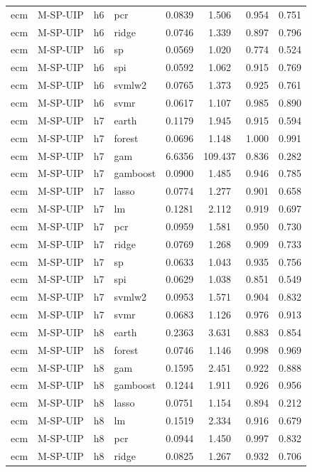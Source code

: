 \begin{ThreePartTable}
\begin{longtable}[t]{llclcccc}
ecm & M-SP-UIP & h6 & pcr & 0.0839 & 1.506 & 0.954 & 0.751\\
ecm & M-SP-UIP & h6 & ridge & 0.0746 & 1.339 & 0.897 & 0.796\\
ecm & M-SP-UIP & h6 & sp & 0.0569 & 1.020 & 0.774 & 0.524\\
ecm & M-SP-UIP & h6 & spi & 0.0592 & 1.062 & 0.915 & 0.769\\
ecm & M-SP-UIP & h6 & svmlw2 & 0.0765 & 1.373 & 0.925 & 0.761\\
ecm & M-SP-UIP & h6 & svmr & 0.0617 & 1.107 & 0.985 & 0.890\\
\addlinespace
ecm & M-SP-UIP & h7 & earth & 0.1179 & 1.945 & 0.915 & 0.594\\
ecm & M-SP-UIP & h7 & forest & 0.0696 & 1.148 & 1.000 & 0.991\\
ecm & M-SP-UIP & h7 & gam & 6.6356 & 109.437 & 0.836 & 0.282\\
ecm & M-SP-UIP & h7 & gamboost & 0.0900 & 1.485 & 0.946 & 0.785\\
ecm & M-SP-UIP & h7 & lasso & 0.0774 & 1.277 & 0.901 & 0.658\\
ecm & M-SP-UIP & h7 & lm & 0.1281 & 2.112 & 0.919 & 0.697\\
ecm & M-SP-UIP & h7 & pcr & 0.0959 & 1.581 & 0.950 & 0.730\\
ecm & M-SP-UIP & h7 & ridge & 0.0769 & 1.268 & 0.909 & 0.733\\
ecm & M-SP-UIP & h7 & sp & 0.0633 & 1.043 & 0.935 & 0.756\\
ecm & M-SP-UIP & h7 & spi & 0.0629 & 1.038 & 0.851 & 0.549\\
ecm & M-SP-UIP & h7 & svmlw2 & 0.0953 & 1.571 & 0.904 & 0.832\\
ecm & M-SP-UIP & h7 & svmr & 0.0683 & 1.126 & 0.976 & 0.913\\
\addlinespace
ecm & M-SP-UIP & h8 & earth & 0.2363 & 3.631 & 0.883 & 0.854\\
ecm & M-SP-UIP & h8 & forest & 0.0746 & 1.146 & 0.998 & 0.969\\
ecm & M-SP-UIP & h8 & gam & 0.1595 & 2.451 & 0.922 & 0.888\\
ecm & M-SP-UIP & h8 & gamboost & 0.1244 & 1.911 & 0.926 & 0.956\\
ecm & M-SP-UIP & h8 & lasso & 0.0751 & 1.154 & 0.894 & 0.212\\
ecm & M-SP-UIP & h8 & lm & 0.1519 & 2.334 & 0.916 & 0.679\\
ecm & M-SP-UIP & h8 & pcr & 0.0944 & 1.450 & 0.997 & 0.832\\
ecm & M-SP-UIP & h8 & ridge & 0.0825 & 1.267 & 0.932 & 0.706\\

\end{longtable}
\end{ThreePartTable}
